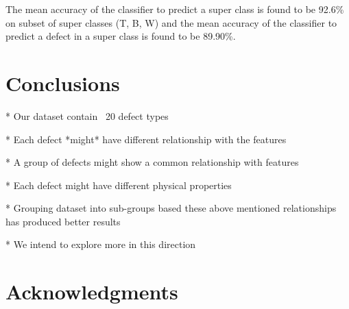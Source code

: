 \documentclass{sig-alternate-05-2015}
\begin{document}
The mean accuracy of the classifier to predict a super class is found to be 92.6\% on subset of super classes (T, B, W) and the mean accuracy of the classifier to predict a defect in a super class is found to be 89.90\%.

\section{Conclusions}
* Our dataset contain ~20 defect types

* Each defect *might* have different relationship with the features

* A group of defects might show a common relationship with features

* Each defect might have different physical properties 

* Grouping dataset into sub-groups based these above mentioned 
relationships has produced better results

* We intend to explore more in this direction

\section{Acknowledgments}




\end{document}
